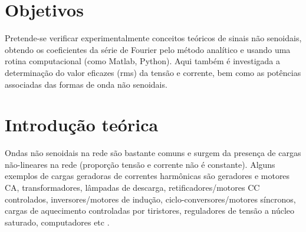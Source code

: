 \documentclass[a4paper,12pt,oneside,openany,table,xcdraw]{article}
\begin{document}
\newcommand{\thedepartment}{Faculdade de Engenharia Elétrica}
\newcommand{\thecourse}{FEELT}
\newcommand{\thetitle}{ANÁLISE DE ONDAS NÃO SENOIDAIS - LÂMPADAS (CARGAS NÃO LINEARES)}
\newcommand{\thetype}{Relatório da Disciplina de Experimental de Circuitos Elétricos II}
\newcommand{\theproftitle}{Bacharel em Engenharia Elétrica}
\newcommand{\thestudent}{Lesly Viviane Montúfar Berrios\\
\centering11811ETE001}
\newcommand{\theadvisor}{Prof. Wellington Maycon Santos Bernardes}
\newcommand{\thecity}{Uberlândia}

\thispagestyle{empty}



\onehalfspacing
\tableofcontents %
\newpage

\section{Objetivos} %
Pretende-se verificar experimentalmente conceitos teóricos de sinais não senoidais, obtendo os coeficientes da série de Fourier pelo método analítico e usando uma rotina computacional (como Matlab, Python). Aqui também é investigada a determinação do valor eficazes (rms) da tensão e corrente, bem como as potências associadas das formas de onda não senoidais.

\section{Introdução teórica} %

Ondas não senoidais na rede são bastante comuns e surgem da presença de cargas não-lineares na rede (proporção tensão e corrente não é constante). Alguns exemplos de cargas geradoras de correntes harmônicas são geradores e motores CA, transformadores, lâmpadas de descarga, retificadores/motores CC controlados, inversores/motores de indução, ciclo-conversores/motores síncronos, cargas de aquecimento controladas por tiristores, reguladores de tensão a núcleo saturado, computadores etc \cite{PH}. 
\end{document}
